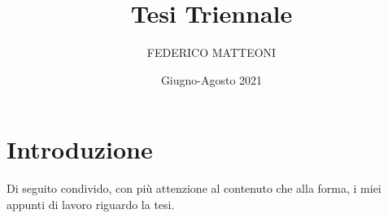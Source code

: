 \documentclass[11pt, a4paper, twoside, openright]{book}
\title{Tesi Triennale}
\author{FEDERICO MATTEONI}
\date{Giugno-Agosto 2021}
\begin{document}
	
	\frontmatter
	\begin{titlepage}
		\thispagestyle{empty}
		
		\thispagestyle{empty}
		\cleardoublepage
	\end{titlepage}	
	\cleardoublepage
	\tableofcontents
	\cleardoublepage
	\listoffigures
	\cleardoublepage
	\listoftables
	
	
    
    \mainmatter

    \backmatter
	
	
	
\iffalse
\section{Introduzione}
Di seguito condivido, con più attenzione al contenuto che alla forma, i miei appunti di lavoro riguardo la tesi.
\pagebreak
\end{document}
